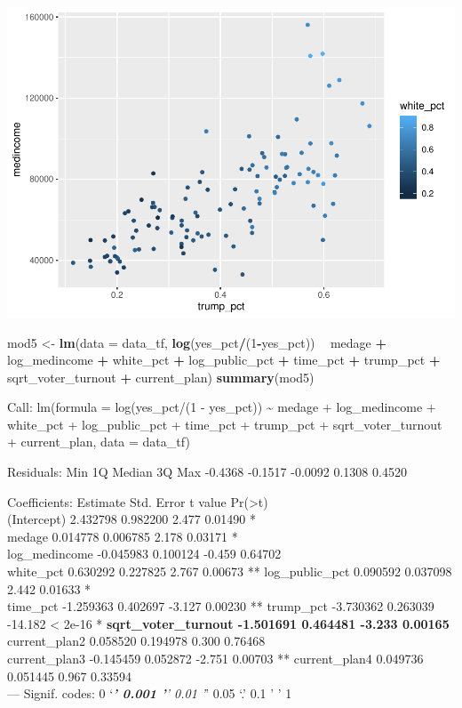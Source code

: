 \documentclass[
]{article}
\newenvironment{Shaded}{\begin{snugshade}}{\end{snugshade}}
\newcommand{\DataTypeTok}[1]{\textcolor[rgb]{0.13,0.29,0.53}{#1}}
\newcommand{\DecValTok}[1]{\textcolor[rgb]{0.00,0.00,0.81}{#1}}
\newcommand{\KeywordTok}[1]{\textcolor[rgb]{0.13,0.29,0.53}{\textbf{#1}}}
\newcommand{\NormalTok}[1]{#1}
\newcommand{\OperatorTok}[1]{\textcolor[rgb]{0.81,0.36,0.00}{\textbf{#1}}}
\newcommand{\StringTok}[1]{\textcolor[rgb]{0.31,0.60,0.02}{#1}}
\begin{document}
\includegraphics{Zhong_paper_files/figure-latex/unnamed-chunk-14-1.pdf}

\begin{Shaded}
\begin{Highlighting}[]
\NormalTok{mod5 <-}\StringTok{ }\KeywordTok{lm}\NormalTok{(}\DataTypeTok{data =}\NormalTok{ data_tf, }\KeywordTok{log}\NormalTok{(yes_pct}\OperatorTok{/}\NormalTok{(}\DecValTok{1}\OperatorTok{-}\NormalTok{yes_pct)) }\OperatorTok{~}\StringTok{ }\NormalTok{medage }\OperatorTok{+}\StringTok{ }\NormalTok{log_medincome }\OperatorTok{+}\StringTok{ }\NormalTok{white_pct }\OperatorTok{+}\StringTok{ }\NormalTok{log_public_pct }\OperatorTok{+}\StringTok{ }\NormalTok{time_pct }\OperatorTok{+}\StringTok{ }\NormalTok{trump_pct }\OperatorTok{+}\StringTok{ }\NormalTok{sqrt_voter_turnout }\OperatorTok{+}\StringTok{ }\NormalTok{current_plan)}
\KeywordTok{summary}\NormalTok{(mod5)}
\end{Highlighting}
\end{Shaded}

Call: lm(formula = log(yes\_pct/(1 - yes\_pct)) \textasciitilde{} medage
+ log\_medincome + white\_pct + log\_public\_pct + time\_pct +
trump\_pct + sqrt\_voter\_turnout + current\_plan, data = data\_tf)

Residuals: Min 1Q Median 3Q Max -0.4368 -0.1517 -0.0092 0.1308 0.4520

Coefficients: Estimate Std. Error t value
Pr(\textgreater\textbar t\textbar)\\
(Intercept) 2.432798 0.982200 2.477 0.01490 *\\
medage 0.014778 0.006785 2.178 0.03171 *\\
log\_medincome -0.045983 0.100124 -0.459 0.64702\\
white\_pct 0.630292 0.227825 2.767 0.00673 ** log\_public\_pct 0.090592
0.037098 2.442 0.01633 *\\
time\_pct -1.259363 0.402697 -3.127 0.00230 ** trump\_pct -3.730362
0.263039 -14.182 \textless{} 2e-16 *\textbf{ sqrt\_voter\_turnout
-1.501691 0.464481 -3.233 0.00165 } current\_plan2 0.058520 0.194978
0.300 0.76468\\
current\_plan3 -0.145459 0.052872 -2.751 0.00703 ** current\_plan4
0.049736 0.051445 0.967 0.33594\\
--- Signif. codes: 0 `\emph{\textbf{' 0.001 '}' 0.01 '}' 0.05 `.' 0.1 '
' 1
\end{document}
